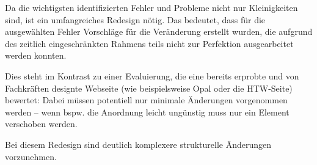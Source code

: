Da die wichtigsten identifizierten Fehler und Probleme nicht nur Kleinigkeiten sind, ist ein umfangreiches Redesign nötig. Das bedeutet, dass für die ausgewählten Fehler Vorschläge für die Veränderung erstellt wurden, die aufgrund des zeitlich eingeschränkten Rahmens teils nicht zur Perfektion ausgearbeitet werden konnten.

Dies steht im Kontrast zu einer Evaluierung, die eine bereits erprobte und von Fachkräften designte Webseite (wie beispielsweise Opal oder die HTW-Seite) bewertet: Dabei müssen potentiell nur minimale Änderungen vorgenommen werden -- wenn bspw. die Anordnung leicht ungünstig muss nur ein Element verschoben werden. 

Bei diesem Redesign sind deutlich komplexere strukturelle Änderungen vorzunehmen.




























